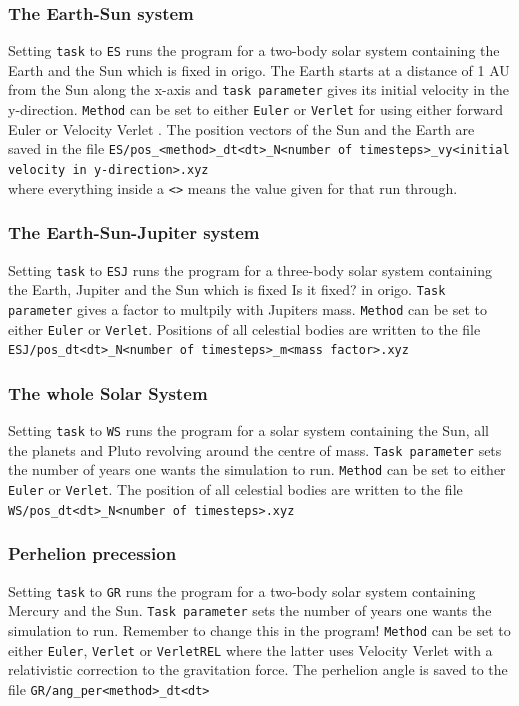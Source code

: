 \documentclass{article}
\newcommand{\husk}[1]{\color{red} #1 \color{black}}
\begin{document}
\subsubsection*{The Earth-Sun system}
Setting \texttt{task} to \texttt{ES} runs the program for a two-body solar system containing the Earth and the Sun which is fixed in origo. The Earth starts at a distance of 1 AU from the Sun along  the x-axis and \texttt{task parameter} gives its initial velocity in the y-direction. \texttt{Method} can be set to either \texttt{Euler} or \texttt{Verlet} for using either forward Euler or Velocity Verlet . The position vectors of the Sun and the Earth are saved in the file \texttt{ES/pos\_<method>\_dt<dt>\_N<number of timesteps>\_vy<initial velocity in y-direction>.xyz}\\ where everything inside a \texttt{<>} means the value given for that run through.
\subsubsection*{The Earth-Sun-Jupiter system}
Setting \texttt{task} to \texttt{ESJ} runs the program for a three-body solar system containing the Earth, Jupiter and the Sun which is fixed \husk{Is it fixed?} in origo. \texttt{Task parameter} gives a factor to multpily with Jupiters mass. \texttt{Method} can be set to either \texttt{Euler} or \texttt{Verlet}. 
Positions of all celestial bodies are written to the file \\ \texttt{ESJ/pos\_dt<dt>\_N<number of timesteps>\_m<mass factor>.xyz}
\subsubsection*{The whole Solar System}
Setting \texttt{task} to \texttt{WS} runs the program for a solar system containing the Sun, all the planets and Pluto revolving around the centre of mass. \texttt{Task parameter} sets the number of years one wants the simulation to run. \texttt{Method} can be set to either \texttt{Euler} or \texttt{Verlet}. The position of all celestial bodies are written to the file \\ 
\texttt{WS/pos\_dt<dt>\_N<number of timesteps>.xyz}
\subsubsection*{Perhelion precession}
Setting \texttt{task} to \texttt{GR} runs the program for a two-body solar system containing Mercury and the Sun. \texttt{Task parameter} sets the number of years one wants the simulation to run. \husk{Remember to change this in the program!} \texttt{Method} can be set to either \texttt{Euler}, \texttt{Verlet} or \texttt{VerletREL} where the latter uses Velocity Verlet with a relativistic correction to the gravitation force. The perhelion angle is saved to the file
\texttt{GR/ang\_per<method>\_dt<dt>}
\end{document}
